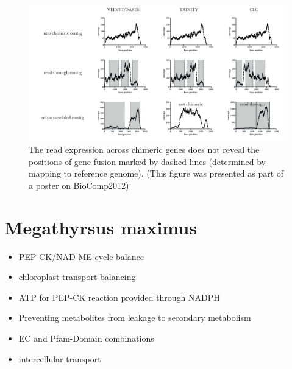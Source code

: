 		\begin{figure}%
			\includegraphics[width=\columnwidth]{images/conclusions_chimeraByExpression}%
			\caption{The read expression across chimeric genes does not reveal the positions of gene fusion marked by dashed lines (determined by mapping to reference genome). (This figure was presented as part of a poster on BioComp2012)}%
			\label{fig:conclusions_chimeraByExpression}%
		\end{figure}
 \section{Megathyrsus maximus}
	\begin{itemize}
		\item PEP-CK/NAD-ME cycle balance
		\item chloroplast transport balancing
		\item ATP for PEP-CK reaction provided through NADPH
		\item Preventing metabolites from leakage to secondary metabolism
		\item EC and Pfam-Domain combinations
		\item intercellular transport
	\end{itemize}
		